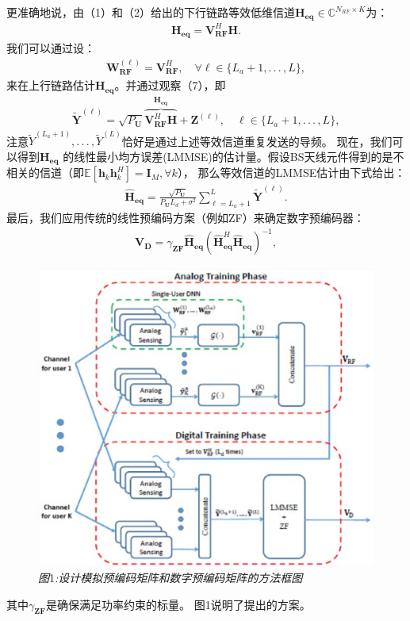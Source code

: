 \documentclass[10pt,journal,final]{IEEEtran}%
\begin{document}
更准确地说，由（1）和（2）给出的下行链路等效低维信道$\mathbf{H}_{\mathbf{eq}}\in \mathbb{C}^{N_{RF} \times K}$为：
\vspace{-0.5em}
\begin{align}
\mathbf{H}_{\mathbf{eq}}=\mathbf{V}_{\mathbf{RF}}^{H}\mathbf{H}.
\end{align}
我们可以通过设：
\begin{align}
\mathbf{W}_{\mathbf{RF}}^{(\ell)}=\mathbf{V}_{\mathbf{RF}}^{H},\quad \forall \ell \in\{L_{a}+1,.\,.\,.\, ,L\},
\end{align}
来在上行链路估计$\mathbf{H}_{\mathbf{eq}}$。并通过观察（7），即
\begin{align}
\tilde{\mathbf{Y}}^{(\ell)}=\sqrt{P_{\mathbf{U}}}\overbrace{\mathbf{V}_{\mathbf{RF}}^{H}\mathbf{H}} ^{\mathbf{H}_{\mathbf{eq}}}+\mathbf{Z}^{(\ell)},\quad
\ell \in\{L_{a}+1,.\,.\,.\, ,L\},
\end{align}
注意$\tilde{Y}^{(L_{a}+1)},.\, .\, .\, ,\tilde{Y}^{(L)}$恰好是通过上述等效信道重复发送的导频。 现在，我们可以得到$\mathbf{H}_{\mathbf{eq}}$
的线性最小均方误差(LMMSE)的估计量。假设BS天线元件得到的是不相关的信道（即$\mathbb{E}[\mathbf{h}_{k}\mathbf{h}_{k}^{H}]=\mathbf{I}_{M},\forall k$），
那么等效信道的LMMSE估计由下式给出：
\begin{align}
\hat{\mathbf{H}}_{\mathbf{eq}}= \frac{\sqrt{P_{\mathbf{U}}}}{P_{\mathbf{U}} L_{d}+\sigma ^{2}}\sum_{\ell=L_{a}+1}^{L}\tilde{\mathbf{Y}}^{(\ell)}.   
\end{align}
最后，我们应用传统的线性预编码方案（例如ZF）来确定数字预编码器：
\begin{align}
\mathbf{V}_{\mathbf{D}}=\gamma_{\mathbf{ZF}}\hat{\mathbf{H}}_{\mathbf{eq}}(\hat{\mathbf{H}}_{\mathbf{eq}}^{H}\hat{\mathbf{H}}_{\mathbf{eq}})^{-1},
\end{align}
\begin{figure}[H]
    \centering
    \includegraphics[scale=0.4]{1.eps}
    \caption*{\textit{\small{图}}\small{1}\textit{\small{:设计模拟预编码矩阵和数字预编码矩阵的方法框图}}}
\end{figure}
\vspace{-0.9em}
其中$\gamma_{\mathbf{ZF}}$是确保满足功率约束的标量。 图1说明了提出的方案。
\end{document}
